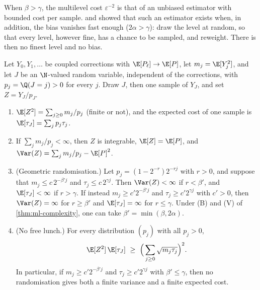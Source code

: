 When $\beta>\gamma$, the multilevel cost $\varepsilon^{-2}$ is that of an unbiased estimator with
bounded cost per sample.  and \textcite{rhee-glynn} showed that such an
estimator exists when, in addition, the bias vanishes fast enough ($2\alpha>\gamma$): draw the level
at random, so that every level, however fine, has a chance to be sampled, and reweight. There is
then no finest level and no bias.

\begin{proposition}\label{prop:ml-unbiased}
Let $Y_0,Y_1,\dots$ be coupled corrections with $\E[P_\ell]\to\E[P]$, let $m_j=\E[Y_j^2]$, and
let $J$ be an $\N$-valued random variable, independent of the corrections, with
$p_j=\Q(J=j)>0$ for every $j$. Draw $J$, then one sample of $Y_J$, and set $Z=Y_J/p_J$.
\begin{enumerate}[label=(\roman*)]
  \item $\E[Z^2]=\sum_{j\ge0}m_j/p_j$ (finite or not), and the expected cost of one sample is
    $\E[\tau_J]=\sum_jp_j\tau_j$.
  \item If $\sum_jm_j/p_j<\infty$, then $Z$ is integrable, $\E[Z]=\E[P]$, and
    $\Var(Z)=\sum_jm_j/p_j-\E[P]^2$.
  \item (Geometric randomisation.) Let $p_j=(1-2^{-r})2^{-rj}$ with $r>0$, and suppose that
    $m_j\le c\,2^{-\beta'j}$ and $\tau_j\le c\,2^{\gamma j}$. Then $\Var(Z)<\infty$ if $r<\beta'$, and
    $\E[\tau_J]<\infty$ if $r>\gamma$. If instead $m_j\ge c'2^{-\beta'j}$ and $\tau_j\ge c'2^{\gamma j}$
    with $c'>0$, then $\Var(Z)=\infty$ for $r\ge\beta'$ and $\E[\tau_J]=\infty$ for $r\le\gamma$.
    Under (B) and (V) of \cref{thm:ml-complexity}, one can take $\beta'=\min(\beta,2\alpha)$.
  \item (No free lunch.) For every distribution $(p_j)$ with all $p_j>0$,
    \[
      \E[Z^2]\,\E[\tau_J]\ \ge\ \Big(\sum_{j\ge0}\sqrt{m_j\tau_j}\Big)^2 .
    \]
    In particular, if $m_j\ge c'2^{-\beta'j}$ and $\tau_j\ge c'2^{\gamma j}$ with $\beta'\le\gamma$, then
    no randomisation gives both a finite variance and a finite expected cost.
\end{enumerate}
\end{proposition}

